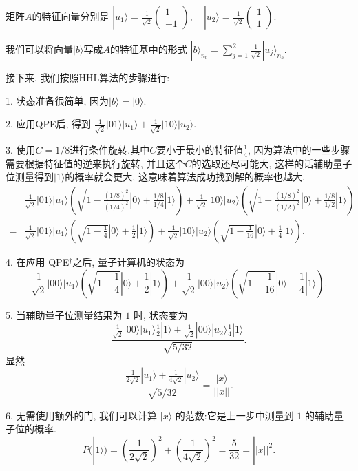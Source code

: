 矩阵$A$的特征向量分别是
$
|u_1\rangle = \frac{1}{\sqrt{2}}\begin{pmatrix}1 \\ -1\end{pmatrix}, \quad |u_2\rangle = \frac{1}{\sqrt{2}}\begin{pmatrix}1 \\ 1\end{pmatrix}.
$

我们可以将向量$|b\rangle$写成$A$的特征基中的形式
$
|b\rangle_{n_b} = \sum_{j=1}^{2}\frac{1}{\sqrt{2}}|u_j\rangle_{n_b}.
$

接下来, 我们按照HHL算法的步骤进行:

1. 状态准备很简单, 因为$|b\rangle=|0\rangle$.

2. 应用QPE后, 得到
$
\frac{1}{\sqrt{2}}|01\rangle|u_1\rangle + \frac{1}{\sqrt{2}}|10\rangle|u_2\rangle.
$

3. 使用$C=1/8$进行条件旋转.其中$C$要小于最小的特征值$\frac{1}{4}$, 因为算法中的一些步骤需要根据特征值的逆来执行旋转, 并且这个$C$的选取还尽可能大, 这样的话辅助量子位测量得到$|1\rangle$的概率就会更大, 这意味着算法成功找到解的概率也越大.
\begin{align}
	&\frac{1}{\sqrt{2}}|01\rangle|u_1\rangle\left( \sqrt{1 - \frac{(1/8)^2}{(1/4)^2}} |0\rangle + \frac{1/8}{1/4} |1\rangle \right) + \frac{1}{\sqrt{2}}|10\rangle|u_2\rangle\left( \sqrt{1 - \frac{(1/8)^2}{(1/2)^2}} |0\rangle + \frac{1/8}{1/2} |1\rangle \right)\\
	=
	&\frac{1}{\sqrt{2}}|01\rangle|u_1\rangle\left( \sqrt{1 - \frac{1}{4}} |0\rangle + \frac{1}{2} |1\rangle \right) + \frac{1}{\sqrt{2}}|10\rangle|u_2\rangle\left( \sqrt{1 - \frac{1}{16}} |0\rangle + \frac{1}{4} |1\rangle \right).
\end{align}

4. 在应用 QPE$^{\dagger}$之后, 量子计算机的状态为
$$
\frac{1}{\sqrt{2}}|00\rangle|u_{1}\rangle\left( \sqrt { 1 - \frac { 1  } {4 } } |0\rangle + \frac { 1 } { 2 } |1\rangle \right) + \frac{1}{\sqrt{2}}|00\rangle|u_{2}\rangle\left( \sqrt { 1 - \frac { 1  } {16 } } |0\rangle + \frac { 1 } { 4 } |1\rangle \right).
$$

5. 当辅助量子位测量结果为 $1$ 时, 状态变为
$$
\frac{\frac{1}{\sqrt{2}}|00\rangle|u_{1}\rangle\frac { 1 } { 2 } |1\rangle + \frac{1}{\sqrt{2}}|00\rangle|u_{2}\rangle\frac { 1 } { 4 } |1\rangle}{\sqrt{5/32}}.
$$
显然
$$
\frac{\frac{1}{2\sqrt{2}}|u_{1}\rangle+ \frac{1}{4\sqrt{2}}|u_{2}\rangle}{\sqrt{5/32}} = \frac{|x\rangle}{||x||}.
$$

6. 无需使用额外的门, 我们可以计算 $|x\rangle$ 的范数:它是上一步中测量到 $1$ 的辅助量子位的概率.
$$
P(|1\rangle) = \left(\frac{1}{2\sqrt{2}}\right)^{2} + \left(\frac{1}{4\sqrt{2}}\right)^{2} = \frac{5}{32} = ||x||^{2}.
$$


